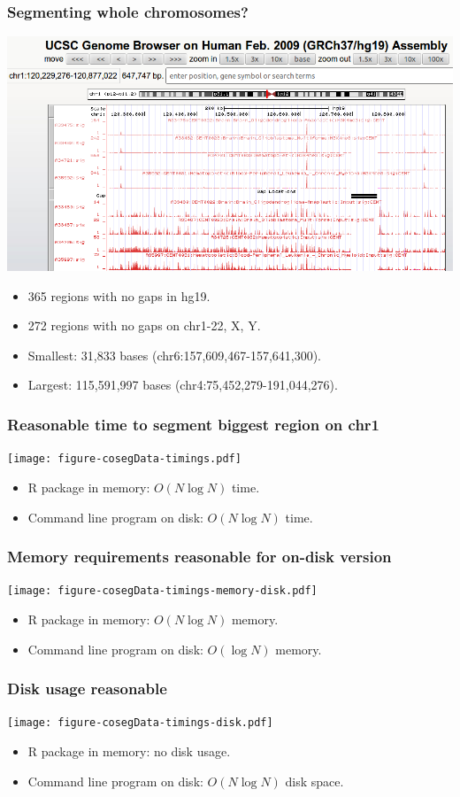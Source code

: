 \documentclass{beamer}
\begin{document}
\begin{frame}
  \frametitle{Segmenting whole chromosomes?}
  \includegraphics[width=\textwidth]{screenshot-gap-peaks}
  \begin{itemize}
  \item 365 regions with no gaps in hg19.
  \item 272 regions with no gaps on chr1-22, X, Y.
  \item Smallest: 31,833 bases (chr6:157,609,467-157,641,300).
  \item Largest: 115,591,997 bases (chr4:75,452,279-191,044,276).
  \end{itemize}
\end{frame}


\begin{frame}
  \frametitle{Reasonable time to segment biggest region on chr1}
  \texttt{[image: figure-cosegData-timings.pdf]}
  \begin{itemize}
  \item R package in memory: $O(N \log N)$ time.
  \item Command line program on disk: $O(N \log N)$ time.
  \end{itemize}
\end{frame}

\begin{frame}
  \frametitle{Memory requirements reasonable for on-disk version}
  \texttt{[image: figure-cosegData-timings-memory-disk.pdf]}
  \begin{itemize}
  \item R package in memory: $O(N \log N)$ memory.
  \item Command line program on disk: $O(\log N)$ memory.
  \end{itemize}
\end{frame}

\begin{frame}
  \frametitle{Disk usage reasonable}
  \texttt{[image: figure-cosegData-timings-disk.pdf]}
  \begin{itemize}
  \item R package in memory: no disk usage.
  \item Command line program on disk: $O(N \log N)$ disk space.
  \end{itemize}
\end{frame}
\end{document}
